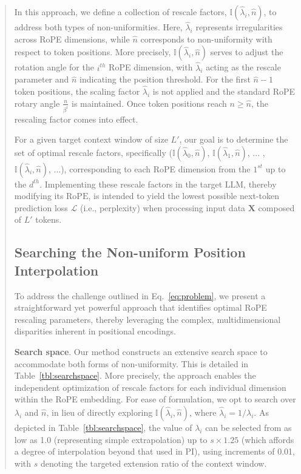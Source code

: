 \begin{abstract}
In this approach, we define a collection of rescale factors, $\mathbb{I}(\hat{\lambda}_{i},\hat{n})$, to address both types of non-uniformities. Here, $\hat{\lambda}_i$ represents irregularities across RoPE dimensions, while $\hat{n}$ corresponds to non-uniformity with respect to token positions. More precisely, $\mathbb{I}(\hat{\lambda}_{i},\hat{n})$ serves to adjust the rotation angle for the $i^{th}$ RoPE dimension, with $\hat{\lambda}_i$ acting as the rescale parameter and $\hat{n}$ indicating the position threshold. For the first $\hat{n}-1$ token positions, the scaling factor $\hat{\lambda}_i$ is not applied and the standard RoPE rotary angle $\frac{n}{\beta^i}$ is maintained. Once token positions reach $n\geq\hat{n}$, the rescaling factor comes into effect.

For a given target context window of size $L'$, our goal is to determine the set of optimal rescale factors, specifically ($\mathbb{I}(\hat{\lambda}_{0},\hat{n})$, $\mathbb{I}(\hat{\lambda}_{1},\hat{n})$, ... , $\mathbb{I}(\hat{\lambda}_{i},\hat{n})$, ...), corresponding to each RoPE dimension from the $1^{st}$ up to the $d^{th}$. Implementing these rescale factors in the target $\text{LLM}$, thereby modifying its $\text{RoPE}$, is intended to yield the lowest possible next-token prediction loss $\mathcal{L}$ (i.e., perplexity) when processing input data $\mathbf{X}$ composed of $L'$ tokens.

\subsection{Searching the Non-uniform Position Interpolation}

To address the challenge outlined in Eq.~\ref{eq:problem}, we present a straightforward yet powerful approach that identifies optimal RoPE rescaling parameters, thereby leveraging the complex, multidimensional disparities inherent in positional encodings.

\textbf{Search space}. Our method constructs an extensive search space to accommodate both forms of non-uniformity. This is detailed in Table~\ref{tbl:searchspace}. More precisely, the approach enables the independent optimization of rescale factors for each individual dimension within the RoPE embedding. For ease of formulation, we opt to search over $\lambda_i$ and $\hat{n}$, in lieu of directly exploring $\mathbb{I}(\hat{\lambda}_{i},\hat{n})$, where $\hat{\lambda}_{i}=1/\lambda_i$. As depicted in Table~\ref{tbl:searchspace}, the value of $\lambda_i$ can be selected from as low as 1.0 (representing simple extrapolation) up to $s\times1.25$ (which affords a degree of interpolation beyond that used in PI), using increments of 0.01, with $s$ denoting the targeted extension ratio of the context window.


\end{abstract}
